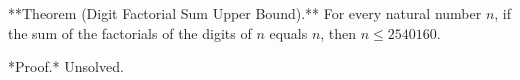 
**Theorem (Digit Factorial Sum Upper Bound).** For every natural number $n$, if the sum of the factorials of the digits of $n$ equals $n$, then $n \leq 2540160$.

*Proof.* Unsolved.